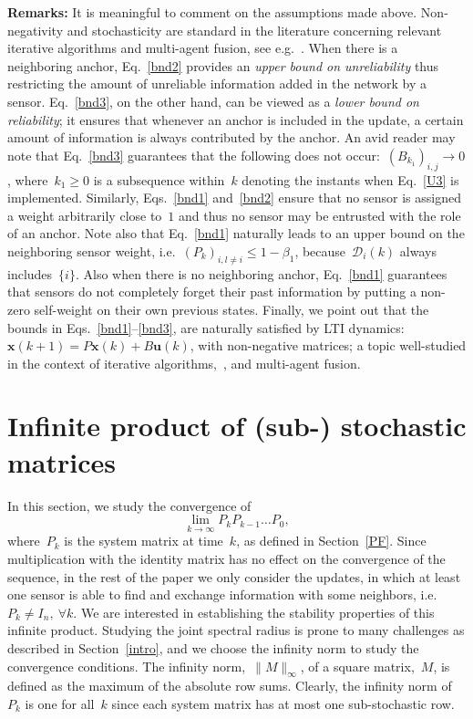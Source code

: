 \documentclass[draftclsnofoot, onecolumn, 12pt]{IEEEtran}
\def\mc{\mathcal}
\def\mb{\mathbf}
\def\ra{\rightarrow}
\begin{document}
{\bf Remarks:} It is meaningful to comment on the assumptions made above. Non-negativity and stochasticity are standard in the literature concerning relevant iterative algorithms and multi-agent fusion, see e.g.~\cite{5509836,5456181,4456762,khan2009distributed}. When there is a neighboring anchor, Eq.~\eqref{bnd2} provides an \emph{upper bound on unreliability} thus restricting the amount of unreliable information added in the network by a sensor. Eq.~\eqref{bnd3}, on the other hand, can be viewed as a \emph{lower bound on reliability}; it ensures that whenever an anchor is included in the update, a certain amount of information is always contributed by the anchor. An avid reader may note that Eq.~\eqref{bnd3} guarantees that the following does not occur:~$({B}_{k_1})_{i,j}\ra0$, where~$k_1\geq0$ is a subsequence within~$k$ denoting the instants when Eq.~\eqref{U3} is implemented. Similarly, Eqs.~\eqref{bnd1} and~\eqref{bnd2} ensure that no sensor is assigned a weight arbitrarily close to~$1$ and thus no sensor may be entrusted with the role of an anchor. Note also that Eq.~\eqref{bnd1} naturally leads to an upper bound on the neighboring sensor weight, i.e.~$(P_k)_{i,l\neq i}\leq1-\beta_1$, because~$\mc{D}_i(k)$ always includes~$\{i\}$. Also when there is no neighboring anchor, Eq.~\eqref{bnd1} guarantees that sensors do not completely forget their past information by putting a non-zero self-weight on their own previous states. Finally, we point out that the bounds in Eqs.~\eqref{bnd1}--\eqref{bnd3}, are naturally satisfied by LTI dynamics:~$\mb{x}(k+1)=P\mb{x}(k) + B\mb{u}(k)$, with non-negative matrices; a topic well-studied in the context of iterative algorithms,~\cite{tsit_book,plemmons:79}, and multi-agent fusion. 

\section{Infinite product of (sub-) stochastic matrices}\label{IP}
In this section, we study the convergence of 
\begin{equation}\label{eq11}
\lim_{k \rightarrow \infty}{{P}}_{k}{{P}}_{k-1} \ldots {{P}}_0,
\end{equation}
where~${{P}}_{k}$ is the system matrix at time~$k$, as defined in Section~\ref{PF}. Since multiplication with the identity matrix has no effect on the convergence of the sequence, in the rest of the paper we only consider the updates, in which at least one sensor is able to find and exchange information with some neighbors, i.e. ${{P}}_{k} \neq I_n,~\forall k$. We are interested in establishing the stability properties of this infinite product. Studying the joint spectral radius is prone to many challenges as described in Section~\ref{intro}, and we choose the infinity norm to study the convergence conditions. The infinity norm,~$\|M\|_\infty$, of a square matrix,~$M$, is defined as the maximum of the absolute row sums. Clearly, the infinity norm of~${{P}}_k$ is one for all~$k$ since each system matrix has at most one sub-stochastic row. 
\end{document}
